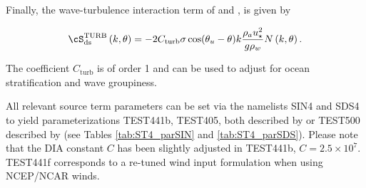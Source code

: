 Finally, the wave-turbulence interaction term of \cite{art:TB02} and \cite{art:AJ06},
is given by

\begin{equation}
\cS_{\mathrm{ds}}^{\mathrm{TURB}}\left(k,\theta\right) = - 2
C_{\mathrm{turb}} \sigma \cos(\theta_u - \theta) k \frac{\rho_a
u_\star^2}{g \rho_w}  N\left(k,\theta\right) .
\end{equation}

\noindent
The coefficient $C_{\mathrm{turb}}$ is of order 1 and can be used to adjust for
ocean stratification and wave groupiness.

All relevant source term parameters can be set via the namelists {\F SIN4} and {\F SDS4}
to yield parameterizations TEST441b, TEST405, both described by
\cite{art:Aea10} or TEST500 described by \cite{art:FA12} (see Tables \ref{tab:ST4_parSIN} and \ref{tab:ST4_parSDS}). Please note that the
DIA constant $C$ has been slightly adjusted in TEST441b, $C=2.5\times
10^7$. TEST441f corresponds to a re-tuned wind input formulation when using
NCEP/NCAR winds.

